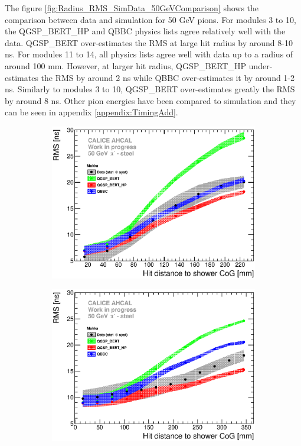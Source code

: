 The figure \ref{fig:Radius_RMS_SimData_50GeVComparison} shows the comparison between data and simulation for 50 GeV pions. For modules 3 to 10, the QGSP\_BERT\_HP and QBBC physics lists agree relatively well with the data. QGSP\_BERT over-estimates the RMS at large hit radius by around 8-10 ns. For modules 11 to 14, all physics lists agree well with data up to a radius of around 100 mm. However, at larger hit radius, QGSP\_BERT\_HP under-estimates the RMS by around 2 ns while QBBC over-estimates it by around 1-2 ns. Similarly to modules 3 to 10, QGSP\_BERT over-estimates greatly the RMS by around 8 ns. Other pion energies have been compared to simulation and they can be seen in appendix \ref{appendix:TimingAdd}.

\begin{figure}[htbp!]
	\begin{subfigure}[t]{0.49\textwidth}
		\centering
		\includegraphics[width=1\textwidth]{../Thesis_Plots/Timing/Pions/Plots/ComparisonToSim/RMS_Radius_50GeV_SSF_Mokka.eps}
		\caption{} \label{fig:Radius_RMS_SSF_SimData_50GeV}
	\end{subfigure}
	\hfill
	\begin{subfigure}[t]{0.49\textwidth}
		\centering
		\includegraphics[width=1\textwidth]{../Thesis_Plots/Timing/Pions/Plots/ComparisonToSim/RMS_Radius_50GeV_BL_Mokka.eps}

\end{subfigure}
\end{figure}
